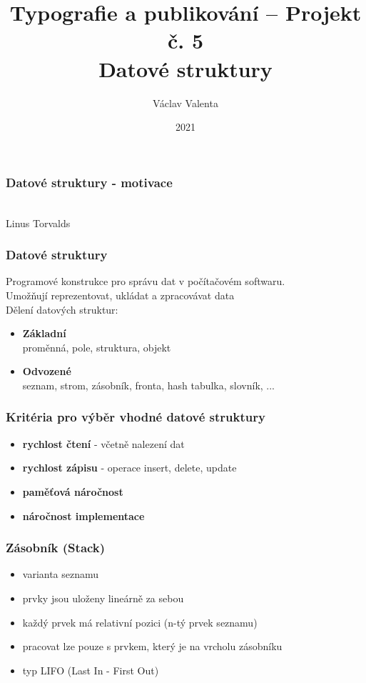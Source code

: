 \documentclass[mode=present, paper=A4paper, orien=landscape, style=default]{beamer}
\title{Typografie a publikování -- Projekt č. 5\\
	\large Datové struktury}
\author{Václav Valenta}
\institute{xvalen29@stud.fit.vutbr.cz}
\date{2021}
\begin{document}
\frame{\titlepage}

\begin{frame}
	\frametitle{Datové struktury - motivace}
	\\
	\smallskip Linus Torvalds
\end{frame}
	
\begin{frame}
	\frametitle{Datové struktury}
	Programové konstrukce pro správu dat v počítačovém softwaru.\\
	Umožňují reprezentovat, ukládat a zpracovávat data\\
	Dělení datových struktur:
	\bigskip
	\begin{itemize}
		\item \textbf{Základní}\\
		proměnná, pole, struktura, objekt
		\item \textbf{Odvozené}\\
		seznam, strom, zásobník, fronta, hash tabulka, slovník, ...
	\end{itemize}
\end{frame}	

\begin{frame}	
	\frametitle{Kritéria pro výběr vhodné datové struktury}
	\begin{itemize}
		\item \textbf{rychlost čtení} - včetně nalezení dat
		\item \textbf{rychlost zápisu} - operace insert, delete, update
		\item \textbf{paměťová náročnost}
		\item \textbf{náročnost implementace}
	\end{itemize}
\end{frame}

\begin{frame}
	\frametitle{Zásobník (Stack)}
	\begin{itemize}
		\item varianta seznamu
		\item prvky jsou uloženy lineárně za sebou
		\item každý prvek má relativní pozici (n-tý prvek seznamu)
		\item pracovat lze pouze s prvkem, který je na vrcholu zásobníku
		\item typ LIFO (Last In - First Out)
	\end{itemize}
\end{frame}
\end{document}
